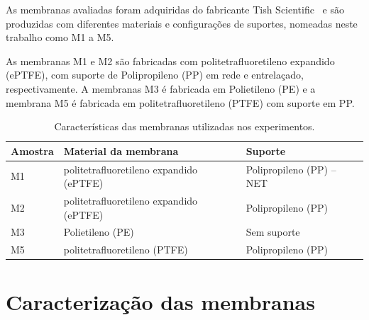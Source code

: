 As membranas avaliadas foram adquiridas do fabricante Tish Scientific~\cite{TischScientific} e são produzidas com diferentes materiais e configurações de suportes, nomeadas neste trabalho como M1 a M5. 

As membranas M1 e M2 são fabricadas com politetrafluoretileno expandido (ePTFE), com suporte de Polipropileno (PP) em rede e entrelaçado, respectivamente. A membranas M3 é fabricada em Polietileno (PE) e a membrana M5 é fabricada em politetrafluoretileno (PTFE) com suporte em PP.


\begin{table}[H]
\centering
\caption{Características das membranas utilizadas nos experimentos.}
\label{tab:membranas}

\begin{tabular}{lll}
\hline
\textbf{Amostra} & \textbf{Material da membrana} & \textbf{Suporte} \\ \hline

M1 & politetrafluoretileno expandido (ePTFE) & Polipropileno (PP) -- NET \\

M2 & politetrafluoretileno expandido (ePTFE) & Polipropileno (PP) \\

M3 & Polietileno (PE) & Sem suporte \\


M5 & politetrafluoretileno (PTFE) & Polipropileno (PP) \\




\hline
\end{tabular}
\end{table}

\section{Caracterização das membranas}


